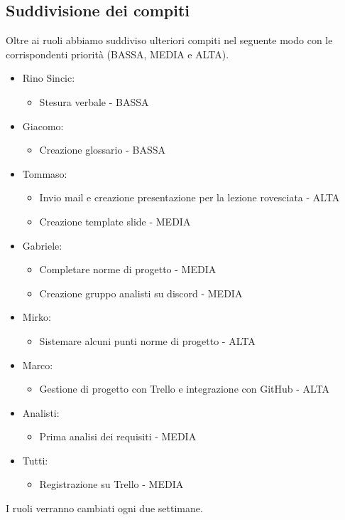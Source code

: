 \subsection{Suddivisione dei compiti}
Oltre ai ruoli abbiamo suddiviso ulteriori compiti nel seguente modo con le corrispondenti priorità (BASSA, MEDIA e ALTA).
\begin{itemize}
    \item Rino Sincic:
    \begin{itemize}
        \item Stesura verbale - BASSA
    \end{itemize}
    \item Giacomo:
    \begin{itemize}
        \item Creazione glossario - BASSA
    \end{itemize}
    \item Tommaso:
    \begin{itemize}
        \item Invio mail e creazione presentazione per la lezione rovesciata - ALTA
        \item Creazione template slide - MEDIA
    \end{itemize}
    \item Gabriele:
    \begin{itemize}
        \item Completare norme di progetto - MEDIA
        \item Creazione gruppo analisti su discord - MEDIA
    \end{itemize}
    \item Mirko:
    \begin{itemize}
        \item Sistemare alcuni punti norme di progetto - ALTA
    \end{itemize}
\newpage
    \item Marco:
    \begin{itemize}
        \item Gestione di progetto con Trello e integrazione con GitHub - ALTA
    \end{itemize}
    \item Analisti:
    \begin{itemize}
        \item Prima analisi dei requisiti - MEDIA
    \end{itemize}
    \item Tutti:
    \begin{itemize}
        \item Registrazione su Trello - MEDIA
    \end{itemize}
\end{itemize}
I ruoli verranno cambiati ogni due settimane.
